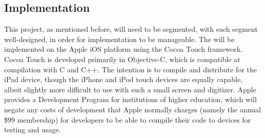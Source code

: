 \documentclass{acm_proc_article-sp}
\begin{document}
\subsection{Implementation}
This project, as mentioned before, will need to be segmented, with each segment well-designed, in order for implementation to be manageable. The will be implemented on the Apple iOS platform using the Cocoa Touch framework. Cocoa Touch is developed primarily in Objective-C, which is compatible at compilation with C and C++. The intention is to compile and distribute for the iPad device, though the iPhone and iPod touch devices are equally capable, albeit slightly more difficult to use with such a small screen and digitizer. Apple provides a Development Program for institutions of higher education, which will negate any costs of development that Apple normally charges (namely the annual \$99 membership) for developers to be able to compile their code to devices for testing and usage.



  
%
%


\balancecolumns

\end{document}
